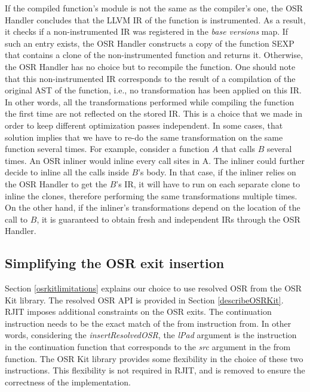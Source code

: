 If the compiled function's module is not the same as the compiler's one, the OSR Handler concludes that the LLVM IR of the function is instrumented.
As a result, it checks if a non-instrumented IR was registered in the \textit{base versions} map.
If such an entry exists, the OSR Handler constructs a copy of the function SEXP that contains a clone of the non-instrumented function and returns it.
Otherwise, the OSR Handler has no choice but to recompile the function.
One should note that this non-instrumented IR corresponds to the result of a compilation of the original AST of the function, i.e., no transformation has been applied on this IR. 
In other words, all the transformations performed while compiling the function the first time are not reflected on the stored IR. 
This is a choice that we made in order to keep different optimization passes independent.
In some cases, that solution implies that we have to re-do the same transformation on the same function several times.
For example, consider a function $A$ that calls $B$ several times.
An OSR inliner would inline every call sites in A.
The inliner could further decide to inline all the calls inside $B$'s body.
In that case, if the inliner relies on the OSR Handler to get the $B$'s IR, it will have to run on each separate clone to inline the clones, therefore performing the same transformations multiple times.
On the other hand, if the inliner's transformations depend on the location of the call to $B$, it is guaranteed to obtain fresh and independent IRs through the OSR Handler.\\


\subsection{Simplifying the OSR exit insertion}

Section \ref{osrkitlimitations} explains our choice to use resolved OSR from the OSR Kit\cite{OSRKit} library.
The resolved OSR API is provided in Section \ref{describeOSRKit}.\\

RJIT imposes additional constraints on the OSR exits. 
The continuation instruction needs to be the exact match of the from instruction from.
In other words, considering the \textit{insertResolvedOSR}, the \textit{lPad} argument is the instruction in the continuation function that corresponds to the \textit{src} argument in the from function.
The OSR Kit library provides some flexibility in the choice of these two instructions. 
This flexibility is not required in RJIT, and is removed to ensure the correctness of the implementation.\\

